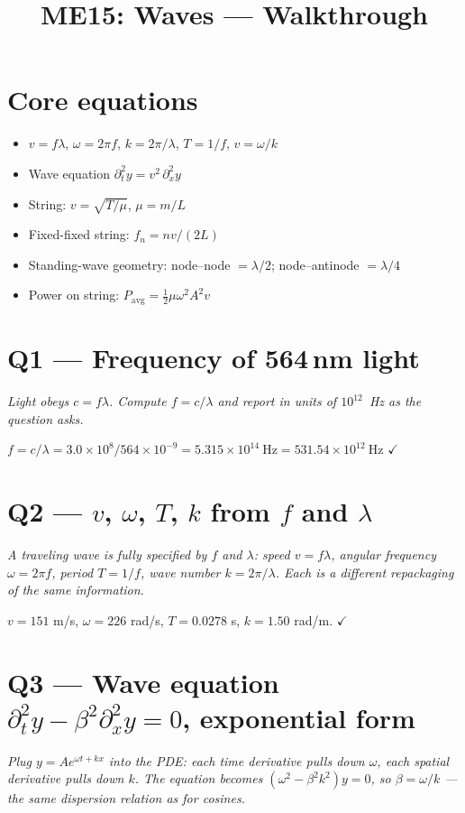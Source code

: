 \documentclass[11pt]{article}
\title{ME15: Waves --- Walkthrough}
\author{}\date{}
\newcommand{\checkmk}{\ensuremath{\checkmark}}
\begin{document}
\maketitle

\section*{Core equations}
\begin{itemize}[leftmargin=*]
\item $v=f\lambda$, $\omega = 2\pi f$, $k = 2\pi/\lambda$, $T=1/f$, $v=\omega/k$
\item Wave equation $\partial_t^2 y = v^2\,\partial_x^2 y$
\item String: $v=\sqrt{T/\mu}$, $\mu = m/L$
\item Fixed-fixed string: $f_n = nv/(2L)$
\item Standing-wave geometry: node--node $= \lambda/2$; node--antinode $= \lambda/4$
\item Power on string: $P_{\text{avg}} = \tfrac12 \mu\omega^2 A^2 v$
\end{itemize}

\section*{Q1 --- Frequency of 564\,nm light}
\emph{Light obeys $c = f\lambda$. Compute $f = c/\lambda$ and report in units of $10^{12}$~Hz as the question asks.}

$f = c/\lambda = 3.0\times10^8/564\times10^{-9} = 5.315\times10^{14}\ \text{Hz} = \boxed{531.54\times 10^{12}\ \text{Hz}}$ \checkmk

\section*{Q2 --- $v$, $\omega$, $T$, $k$ from $f$ and $\lambda$}
\emph{A traveling wave is fully specified by $f$ and $\lambda$: speed $v = f\lambda$, angular frequency $\omega = 2\pi f$, period $T = 1/f$, wave number $k = 2\pi/\lambda$. Each is a different repackaging of the same information.}

$v=151$ m/s, $\omega=226$ rad/s, $T=0.0278$ s, $k=1.50$ rad/m. \checkmk

\section*{Q3 --- Wave equation $\partial_t^2 y - \beta^2\partial_x^2 y = 0$, exponential form}
\emph{Plug $y = A e^{\omega t + kx}$ into the PDE: each time derivative pulls down $\omega$, each spatial derivative pulls down $k$. The equation becomes $(\omega^2 - \beta^2 k^2)y = 0$, so $\beta = \omega/k$ --- the same dispersion relation as for cosines.}
\end{document}

